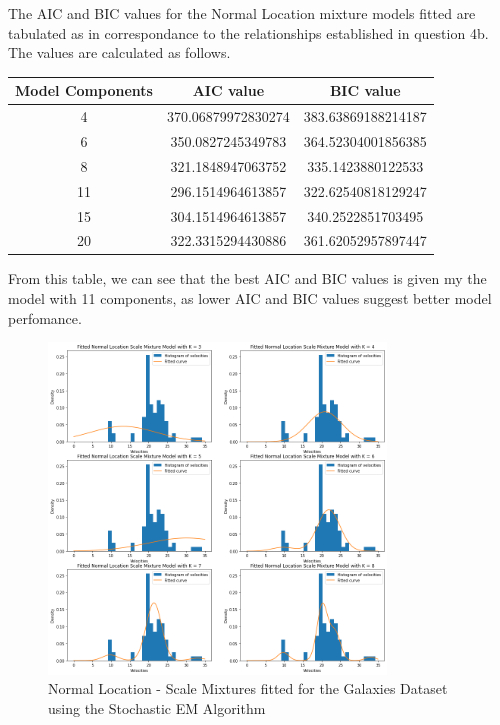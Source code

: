 \documentclass[11pt]{article}
\begin{document}
The AIC and BIC values for the Normal Location mixture models fitted are tabulated as in correspondance to the relationships established in question 4b. The values are calculated as follows.
\begin{center}
\begin{tabular}{ |c|c|c| }
  \hline
 \textbf{Model Components} & \textbf{AIC value} & \textbf{BIC value}\\
 \hline
 4 & 370.06879972830274 & 383.63869188214187 \\
 \hline
 6 & 350.0827245349783 & 364.52304001856385 \\
 \hline
 8 & 321.1848947063752 & 335.1423880122533 \\
 \hline
 11 & 296.1514964613857 & 322.62540818129247 \\
 \hline
 15 & 304.1514964613857 & 340.2522851703495 \\
 \hline
 20 & 322.3315294430886 & 361.62052957897447 \\
 \hline
\end{tabular}
\end{center}
From this table, we can see that the best AIC and BIC values is given my the model with 11 components, as lower AIC and BIC values suggest better model perfomance.
\begin{figure}[H]
  \centering
  \includegraphics[width = 0.8\textwidth]{output5b.png}
  \caption{Normal Location - Scale Mixtures fitted for the Galaxies Dataset using the Stochastic EM Algorithm}
\end{figure}
\end{document}
